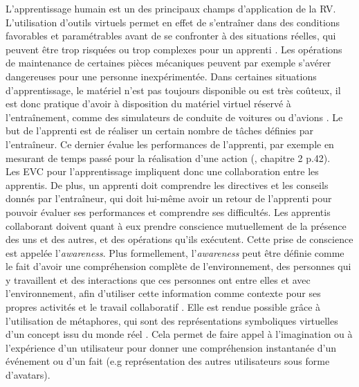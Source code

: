 \documentclass[11pt]{article}
\begin{document}
L'apprentissage humain est un des principaux champs d'application de la RV. L'utilisation d'outils virtuels permet en effet de s'entraîner dans des conditions favorables et paramétrables avant de se confronter à des situations réelles, qui peuvent être trop risquées ou trop complexes pour un apprenti \cite{trv4-intro}. Les opérations de maintenance de certaines pièces mécaniques peuvent par exemple s'avérer dangereuses pour une personne inexpérimentée. Dans certaines situations d'apprentissage, le matériel n'est pas toujours disponible ou est très coûteux, il est donc pratique d'avoir à disposition du matériel virtuel réservé à l'entraînement, comme des simulateurs de conduite de voitures ou d'avions \cite{trv4-intro}. Le but de l'apprenti est de réaliser un certain nombre de tâches définies par l'entraîneur. Ce dernier évalue les performances de l'apprenti, par exemple en mesurant de temps passé pour la réalisation d'une action (\cite{trv2}, chapitre 2 p.42).
\\

Les EVC pour l'apprentissage impliquent donc une collaboration entre les apprentis. De plus, un apprenti doit comprendre les directives et les conseils donnés par l'entraîneur, qui doit lui-même avoir un retour de l'apprenti pour pouvoir évaluer ses performances et comprendre ses difficultés. Les apprentis collaborant doivent quant à eux prendre conscience mutuellement de la présence des uns et des autres, et des opérations qu'ils exécutent. Cette prise de conscience est appelée l'\textit{awareness}. Plus formellement, l'\textit{awareness} peut être définie comme le fait d'avoir une compréhension complète de l'environnement, des personnes qui y travaillent et des interactions que ces personnes ont entre elles et avec l'environnement, afin d'utiliser cette information comme contexte pour ses propres activités et le travail collaboratif \cite{awareness-coordination, environment-awareness}. Elle est rendue possible grâce à l'utilisation de métaphores, qui sont des représentations symboliques virtuelles d'un concept issu du monde réel \cite{trv4-intro}. Cela permet de faire appel à l'imagination ou à l'expérience d'un utilisateur pour donner une compréhension instantanée d'un événement ou d'un fait (e.g représentation des autres utilisateurs sous forme d'avatars).
\\
\end{document}
